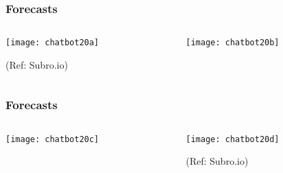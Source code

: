 



\begin{frame}[fragile]\frametitle{Forecasts}

    \begin{columns}
    \begin{column}[t]{0.5\linewidth}
\begin{center}
\texttt{[image: chatbot20a]}

\end{center}

\tiny{(Ref: Subro.io)}

    \end{column}
    \begin{column}[t]{0.5\linewidth}
\begin{center}
\texttt{[image: chatbot20b]}

\end{center}
    \end{column}
  \end{columns}
  

  
\end{frame}

\begin{frame}[fragile]\frametitle{Forecasts}

    \begin{columns}
    \begin{column}[t]{0.5\linewidth}
\begin{center}
\texttt{[image: chatbot20c]}

\end{center}
    \end{column}
    \begin{column}[t]{0.5\linewidth}
\begin{center}
\texttt{[image: chatbot20d]}

\end{center}

\tiny{(Ref: Subro.io)}
    \end{column}
  \end{columns}
  
 
\end{frame}

